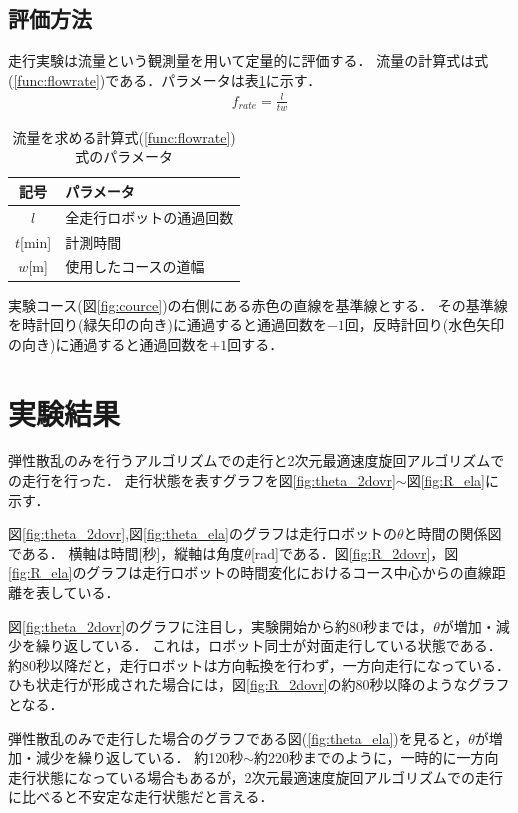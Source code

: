 \documentclass[twocolumn,dvipdfmx]{jarticle}
\begin{document}
\subsection{評価方法}
走行実験は流量という観測量を用いて定量的に評価する．
流量の計算式は式(\ref{func:flowrate})である．パラメータは表\ref{table:flow}に示す．
\vspace{-3.0mm}
\begin{eqnarray}
f_{rate} = \frac{l}{tw}
\label{func:flowrate}
\end{eqnarray}
\begin{table}[htbp]
\begin{center}
\begin{tabular}{|cl|}
\hline
記号 &  パラメータ\\
\hline \hline
$l$ & 全走行ロボットの通過回数 \\
$t$[min] & 計測時間 \\
$w$[m] & 使用したコースの道幅 \\
\hline
\end{tabular}
\end{center}
\caption{流量を求める計算式(\ref{func:flowrate})式のパラメータ}
\label{table:flow}
\end{table}
実験コース(図\ref{fig:cource})の右側にある赤色の直線を基準線とする．
その基準線を時計回り(緑矢印の向き)に通過すると通過回数を$-1$回，反時計回り(水色矢印の向き)に通過すると通過回数を$+1$回する．

\section{実験結果}
弾性散乱のみを行うアルゴリズムでの走行と2次元最適速度旋回アルゴリズムでの走行を行った．
走行状態を表すグラフを図\ref{fig:theta_2dovr}$\sim$図\ref{fig:R_ela}に示す．

図\ref{fig:theta_2dovr},図\ref{fig:theta_ela}のグラフは走行ロボットの$\theta$と時間の関係図である．
横軸は時間[秒]，縦軸は角度$\theta$[rad]である．図\ref{fig:R_2dovr}，図\ref{fig:R_ela}のグラフは走行ロボットの時間変化におけるコース中心からの直線距離を表している．

図\ref{fig:theta_2dovr}のグラフに注目し，実験開始から約80秒までは，$\theta$が増加・減少を繰り返している．
これは，ロボット同士が対面走行している状態である．
約80秒以降だと，走行ロボットは方向転換を行わず，一方向走行になっている．
ひも状走行が形成された場合には，図\ref{fig:R_2dovr}の約80秒以降のようなグラフとなる．

弾性散乱のみで走行した場合のグラフである図(\ref{fig:theta_ela})を見ると，$\theta$が増加・減少を繰り返している．
約120秒$\sim$約220秒までのように，一時的に一方向走行状態になっている場合もあるが，2次元最適速度旋回アルゴリズムでの走行に比べると不安定な走行状態だと言える．
\end{document}
